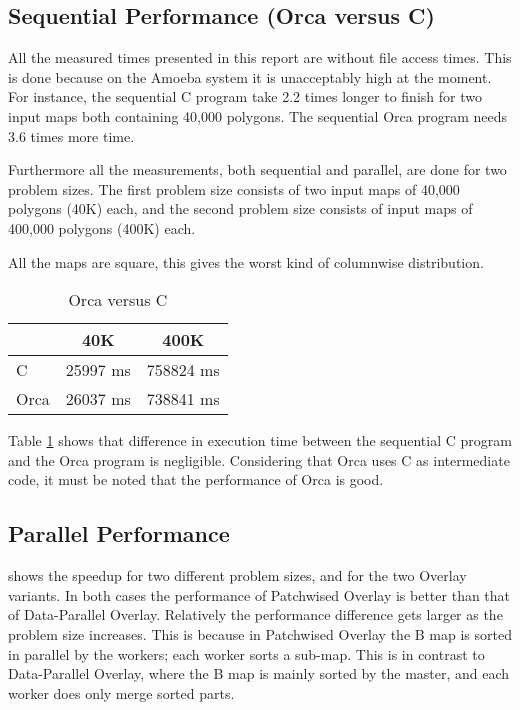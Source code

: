 \subsection{ Sequential Performance (Orca versus C) }

All the measured times presented in this report are without 
file access times.
This is done because on the Amoeba system it is unacceptably high at
the moment.
For instance, the sequential C program take 2.2 times longer to
finish for two input maps both containing 40,000 polygons.
The sequential Orca program needs 3.6 times more time.

Furthermore all the measurements, both sequential and parallel, are done
for two problem sizes.
The first problem size consists of two input maps of 40,000 polygons (40K)
each, and the second problem size consists of input maps of 400,000
polygons (400K) each.

All the maps are square, this gives the worst kind of columnwise
distribution.

\begin{table}[hbt]
  \centering
  \begin{tabular}{|l|c|c|}
    \hline
		& 40K  		& 400K     \\
    \hline
    C 		& 25997 ms	& 758824 ms   \\
    Orca	& 26037 ms 	& 738841 ms   \\
    \hline
  \end{tabular}
  \caption{Orca versus C}
  \label{Orca versus C}
\end{table}

Table 
\ref{Orca versus C} shows that difference in execution time between the
sequential C program and the Orca program is negligible. 
Considering that Orca uses C as intermediate code, it must be noted
that the performance of Orca is good.

\subsection {Parallel Performance}

 shows the speedup
for two different problem sizes, and for the two Overlay variants.
In both cases the performance of Patchwised Overlay is better than
that of Data-Parallel Overlay.
Relatively the performance difference gets larger as the problem size
increases.
This is because in Patchwised Overlay the B map is sorted in
parallel by the workers; each worker sorts a sub-map.
This is in contrast to Data-Parallel Overlay, where the B map is mainly
sorted by the master, and each worker does only merge sorted parts.

